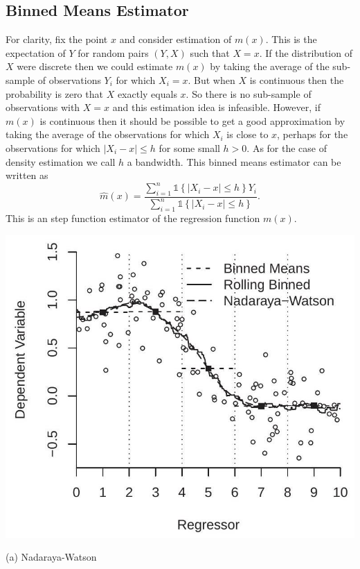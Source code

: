 \documentclass[10pt]{article}
\begin{document}
\subsection{Binned Means Estimator}
For clarity, fix the point $x$ and consider estimation of $m(x)$. This is the expectation of $Y$ for random pairs $(Y, X)$ such that $X=x$. If the distribution of $X$ were discrete then we could estimate $m(x)$ by taking the average of the sub-sample of observations $Y_{i}$ for which $X_{i}=x$. But when $X$ is continuous then the probability is zero that $X$ exactly equals $x$. So there is no sub-sample of observations with $X=x$ and this estimation idea is infeasible. However, if $m(x)$ is continuous then it should be possible to get a good approximation by taking the average of the observations for which $X_{i}$ is close to $x$, perhaps for the observations for which $\left|X_{i}-x\right| \leq h$ for some small $h>0$. As for the case of density estimation we call $h$ a bandwidth. This binned means estimator can be written as
$$
\widehat{m}(x)=\frac{\sum_{i=1}^{n} \mathbb{1}\left\{\left|X_{i}-x\right| \leq h\right\} Y_{i}}{\sum_{i=1}^{n} \mathbb{1}\left\{\left|X_{i}-x\right| \leq h\right\}} .
$$
This is an step function estimator of the regression function $m(x)$.

\includegraphics[max width=\textwidth]{2022_10_23_027876b875523fa3ea56g-02}

(a) Nadaraya-Watson
\end{document}
